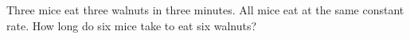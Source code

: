 Three mice eat three walnuts in three minutes. All mice eat at the same constant rate. How long do six mice take to eat six walnuts?
